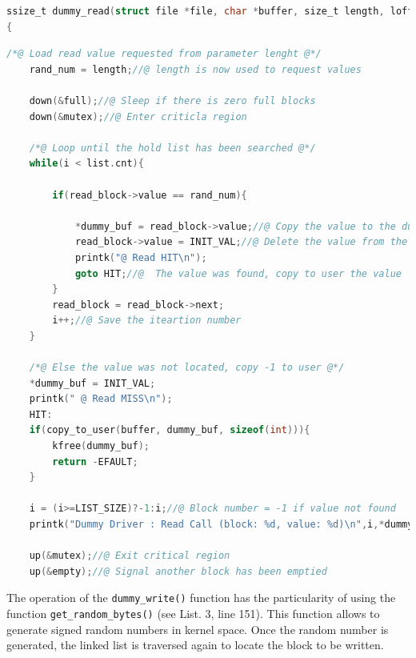 \documentclass[letterpaper,12pt] {article}
\begin{document}
\newpage
\begin{lstlisting}[firstnumber = 86 ,language=C ]	
ssize_t dummy_read(struct file *file, char *buffer, size_t length, loff_t *offset)
{
\end{lstlisting} 
\begin{lstlisting}[firstnumber = 94 ,language=C , caption = Device read function  ]		
	/*@ Load read value requested from parameter lenght @*/
	rand_num = length;//@ length is now used to request values
	
	down(&full);//@ Sleep if there is zero full blocks
	down(&mutex);//@ Enter criticla region

	/*@ Loop until the hold list has been searched @*/
	while(i < list.cnt){	
		
		if(read_block->value == rand_num){
			
			*dummy_buf = read_block->value;//@ Copy the value to the dummy	
			read_block->value = INIT_VAL;//@ Delete the value from the block
			printk("@ Read HIT\n");
			goto HIT;//@  The value was found, copy to user the value	
		}
		read_block = read_block->next;
		i++;//@ Save the iteartion number
	}
	
	/*@ Else the value was not located, copy -1 to user @*/
	*dummy_buf = INIT_VAL;
	printk(" @ Read MISS\n");
	HIT:		
	if(copy_to_user(buffer, dummy_buf, sizeof(int))){  
		kfree(dummy_buf);
		return -EFAULT;
	}
	
	i = (i>=LIST_SIZE)?-1:i;//@ Block number = -1 if value not found	
	printk("Dummy Driver : Read Call (block: %d, value: %d)\n",i,*dummy_buf);
	
	up(&mutex);//@ Exit critical region
	up(&empty);//@ Signal another block has been emptied
\end{lstlisting}

The operation of the \texttt{dummy\_write()} function has the particularity of using the function \texttt{get\_random\_bytes()} (see List. 3, line 151). This function allows to generate signed random numbers in kernel space. Once the random number is generated, the linked list is traversed again to locate the block to be written. \\ 
\end{document}
